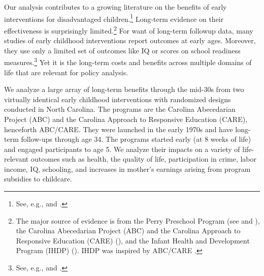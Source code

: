 Our analysis contributes to a growing literature on the benefits of early interventions for disadvantaged children.\footnote{See, e.g., \cite{Currie_2011_AER} and \cite{Elango_Hojman_etal_2016_Early-Edu}.} Long-term evidence on their effectiveness is surprisingly limited.\footnote{The major source of evidence is from the Perry Preschool Program (see \citealp{Schweinhart_Montie_ea_2005_BOOKlifetime} and \citealp{Heckman_Moon_etal_2010_RateofReturn,Heckman_Moon_etal_2010_QE}), the Carolina Abecedarian Project (ABC) and the Carolina Approach to Responsive Education (CARE) (\citealp{Ramey_Campbell_etal_2000_ADS,Ramey-etal_2012-ABC}), and the Infant Health and Development Program (IHDP) (\citealp{Gross_Spiker_etal_1997_BOOKHelpinglowbirth,Duncan_Sojourner_2013_JHR}). IHDP was inspired by ABC/CARE \citep[][]{Gross_Spiker_etal_1997_BOOKHelpinglowbirth}.} For want of long-term followup data, many studies of early childhood interventions report outcomes at early ages. Moreover, they use only a limited set of outcomes like IQ or scores on school readiness measures.\footnote{See, e.g., \cite{Kline_Walters_2016_QJE} and \cite{Weiland_2013_CD_Impacts-of-Pre-K}.} Yet it is the long-term costs and benefits across multiple domains of life that are relevant for policy analysis.

We analyze a large array of long-term benefits through the mid-30s from two virtually identical early childhood interventions with randomized designs conducted in North Carolina. The programs are the Carolina Abecedarian Project (ABC) and the Carolina Approach to Responsive Education (CARE), henceforth ABC/CARE. They were launched in the early 1970s and have long-term follow-ups through age 34. The programs started early (at 8 weeks of life) and engaged participants to age 5. We analyze their impacts on a variety of life-relevant outcomes such as health, the quality of life, participation in crime, labor income, IQ, schooling, and increases in mother's earnings arising from program subsidies to childcare.

